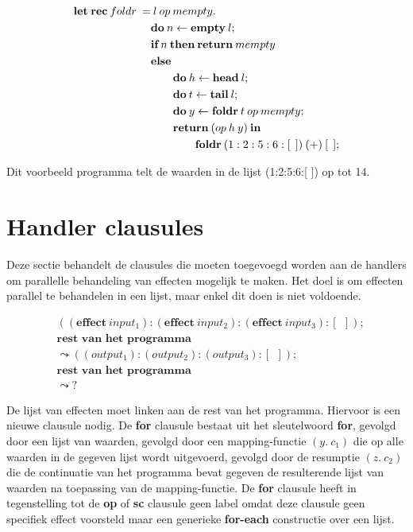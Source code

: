 \begin{equation} \label{eq: sumEx}
    \begin{split}
        \textbf{let\:rec}\:foldr\:= &\:l\:op\:mempty.\: \\
        & \textbf{do}\:n\leftarrow \textbf{empty}\:l; \\
        & \textbf{if}\:n\:\textbf{then}\:\textbf{return}\:mempty \\
        & \textbf{else} \\
        & \qquad \textbf{do}\:h \leftarrow \textbf{head}\:l;\\
        & \qquad \textbf{do}\:t \leftarrow \textbf{tail}\:l; \\
        & \qquad \textbf{do}\:y \leftarrow \textbf{foldr}\:t\:op\:mempty    ; \\
        & \qquad \textbf{return}\:(op\:h\:y)\:\textbf{in} \\
        & \qquad \qquad \textbf{foldr}\:(1:2:5:6:[\:\:])\:(+)\:[\:\:];\\
    \end{split}
\end{equation}

Dit voorbeeld programma telt de waarden in de lijst (1:2:5:6:[ ]) op tot 14.

\section{Handler clausules}
Deze sectie behandelt de clausules die moeten toegevoegd worden aan de handlers om parallelle behandeling van effecten mogelijk te maken. Het doel is om effecten parallel te behandelen in een lijst, maar enkel dit doen is niet voldoende.

\begin{equation}
    \begin{split}
    & ((\textbf{effect}\:input_1):(\textbf{effect}\:input_2):(\textbf{effect}\:input_3):[\:\:]); \\
    & \textbf{rest van het programma} \\
    &\leadsto ((output_1):(output_2):(output_3):[\:\:]); \\
    & \textbf{rest van het programma} \\
    &\leadsto ?
    \end{split}
\end{equation}

De lijst van effecten moet linken aan de rest van het programma. Hiervoor is een nieuwe clausule nodig. De \textbf{for} clausule bestaat uit het sleutelwoord \textbf{for}, gevolgd door een lijst van waarden, gevolgd door een mapping-functie $(y.\:c_{1})$ die op alle waarden in de gegeven lijst wordt uitgevoerd, gevolgd door de resumptie $(z.\:c_{2})$ die de continuatie van het programma bevat gegeven de resulterende lijst van waarden na toepassing van de mapping-functie. De \textbf{for} clausule heeft in tegenstelling tot de \textbf{op} of \textbf{sc} clausule geen label omdat deze clausule geen specifiek effect voorsteld maar een generieke \textbf{for-each} constructie over een lijst. 

